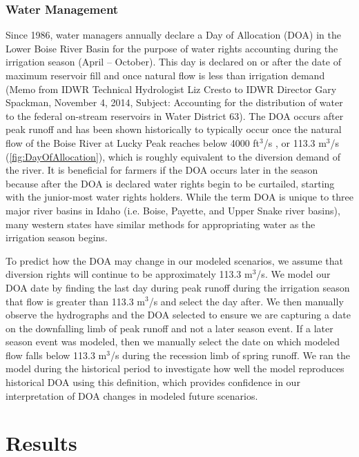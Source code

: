 \documentclass[11pt,letterpaper]{article}
\begin{document}
\subsubsection{Water Management}

Since 1986, water managers annually declare a Day of Allocation (DOA) in the Lower Boise River Basin for the purpose of water rights accounting during the irrigation season (April – October). This day is declared on or after the date of maximum reservoir fill and once natural flow is less than irrigation demand (Memo from IDWR Technical Hydrologist Liz Cresto to IDWR Director Gary Spackman, November 4, 2014, Subject: Accounting for the distribution of water to the federal on-stream reservoirs in Water District 63). The DOA occurs after peak runoff and has been shown historically to typically occur once the natural flow of the Boise River at Lucky Peak reaches below 4000 ft${}^3$/s \citep{Garst:2017bg}, or 113.3 m${}^3$/s (\cref{fig:DayOfAllocation}), which is roughly equivalent to the diversion demand of the river. It is beneficial for farmers if the DOA occurs later in the season because after the DOA is declared water rights begin to be curtailed, starting with the junior-most water rights holders. While the term DOA is unique to three major river basins in Idaho (i.e. Boise, Payette, and Upper Snake river basins), many western states have similar methods for appropriating water as the irrigation season begins.

To predict how the DOA may change in our modeled scenarios, we assume that diversion rights will continue to be approximately 113.3 m${}^3$/s. We model our DOA date by finding the last day during peak runoff during the irrigation season that flow is greater than 113.3 m${}^3$/s and select the day after. We then manually observe the hydrographs and the DOA selected to ensure we are capturing a date on the downfalling limb of peak runoff and not a later season event. If a later season event was modeled, then we manually select the date on which modeled flow falls below 113.3 m${}^3$/s during the recession limb of spring runoff. We ran the model during the historical period to investigate how well the model reproduces historical DOA using this definition, which provides confidence in our interpretation of DOA changes in modeled future scenarios.

\section{Results}
\end{document}
